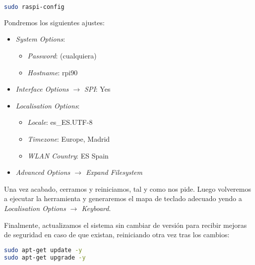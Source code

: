 \begin{lstlisting}[language=sh]
sudo raspi-config
\end{lstlisting}

Pondremos los siguientes ajustes:

\begin{itemize}
\item \emph{System Options}:
\begin{itemize}
\item \emph{Password}: (cualquiera)
\item \emph{Hostname}: rpi90
\end{itemize}
\item \emph{Interface Options $\rightarrow$ SPI}: Yes
\item \emph{Localisation Options}:
\begin{itemize}
\item \emph{Locale}: es\_ES.UTF-8
\item \emph{Timezone}: Europe, Madrid
\item \emph{WLAN Country}: ES Spain
\end{itemize}
\item \emph{Advanced Options $\rightarrow$ Expand Filesystem}
\end{itemize}

Una vez acabado, cerramos y reiniciamos, tal y como nos pide. Luego volveremos
a ejecutar la herramienta y generaremos el mapa de teclado adecuado yendo a
\emph{Localisation Options $\rightarrow$ Keyboard}.

Finalmente, actualizamos el sistema sin cambiar de versión para recibir mejoras
de seguridad en caso de que existan, reiniciando otra vez tras los cambios:
\begin{lstlisting}[language=sh]
sudo apt-get update -y
sudo apt-get upgrade -y
\end{lstlisting}